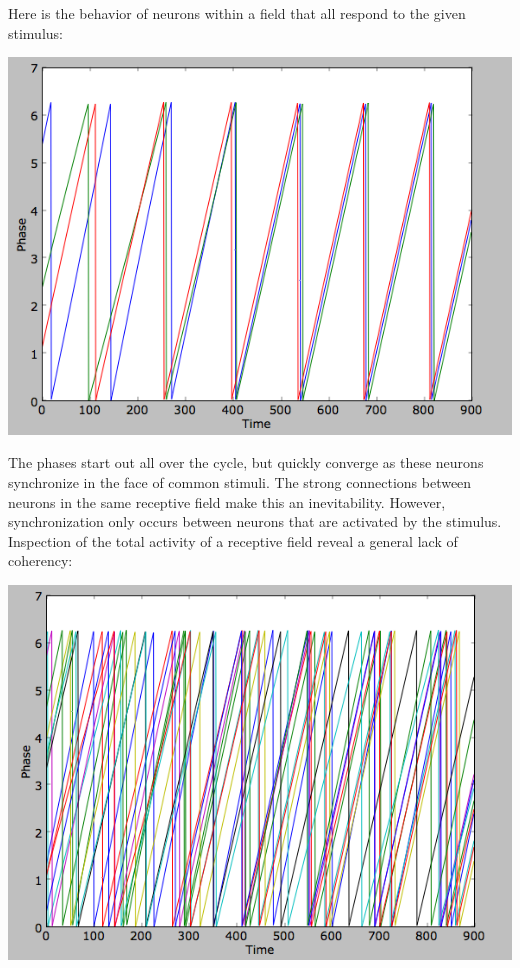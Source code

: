 \documentclass[12pt]{article}
\begin{document}
Here is the behavior of neurons within a field that all respond to the given stimulus:

\includegraphics[scale=0.5]{withinfield.png}

The phases start out all over the cycle, but quickly converge as these neurons synchronize in the face of common stimuli.  The strong connections between neurons in the same receptive field make this an inevitability.  However, synchronization only occurs between neurons that are activated by the stimulus.  Inspection of the total activity of a receptive field reveal a general lack of coherency:

\vspace{10pt}
\includegraphics[scale=0.5]{totalfield.png}
\end{document}
